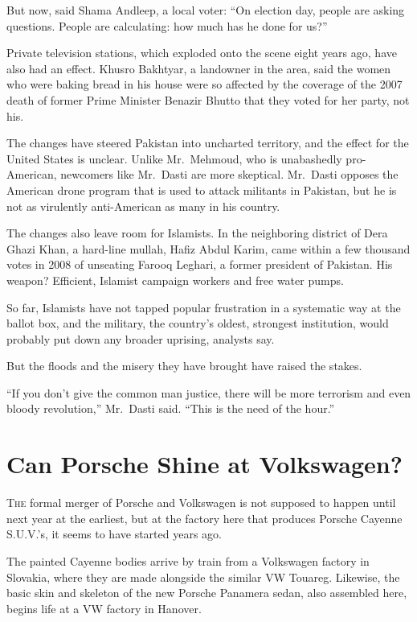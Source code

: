 ﻿\documentclass[12pt]{article}
\begin{document}
But now, said Shama Andleep, a local voter: ``On election day, people are asking questions. People
are calculating: how much has he done for us?''

Private television stations, which exploded onto the scene eight years ago, have also had an effect.
Khusro Bakhtyar, a landowner in the area, said the women who were baking bread in his house were so
affected by the coverage of the 2007 death of former Prime Minister Benazir Bhutto that they voted
for her party, not his.

The changes have steered Pakistan into uncharted territory, and the effect for the United States is
unclear. Unlike Mr.~Mehmoud, who is unabashedly pro-American, newcomers like Mr.~Dasti are more
skeptical. Mr.~Dasti opposes the American drone program that is used to attack militants in
Pakistan, but he is not as virulently anti-American as many in his country.

The changes also leave room for Islamists. In the neighboring district of Dera Ghazi Khan, a
hard-line mullah, Hafiz Abdul Karim, came within a few thousand votes in 2008 of unseating Farooq
Leghari, a former president of Pakistan. His weapon? Efficient, Islamist campaign workers and free
water pumps.

So far, Islamists have not tapped popular frustration in a systematic way at the ballot box, and the
military, the country's oldest, strongest institution, would probably put down any broader uprising,
analysts say.

But the floods and the misery they have brought have raised the stakes.

``If you don't give the common man justice, there will be more terrorism and even bloody
revolution,'' Mr.~Dasti said. ``This is the need of the hour.''

\pagebreak
\section{Can Porsche Shine at Volkswagen?}

\lettrine{T}{he} formal merger of Porsche and Volkswagen is not supposed to
happen until next year at the earliest, but at the factory here that produces Porsche Cayenne
S.U.V.'s, it seems to have started years ago.

The painted Cayenne bodies arrive by train from a Volkswagen factory in Slovakia, where they are
made alongside the similar VW Touareg. Likewise, the basic skin and skeleton of the new Porsche
Panamera sedan, also assembled here, begins life at a VW factory in Hanover.
\end{document}
